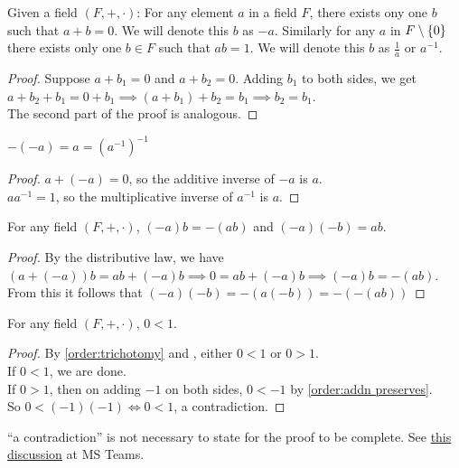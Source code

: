 \documentclass[12pt]{article}
\begin{document}
\begin{lem} \label{lem:unique inverses}
    Given a field $(F, +, \cdot)$: For any element $a$ in a field $F$, there exists ony one $b$ such that $a + b = 0$. We will denote this $b$ as $-a$. Similarly for any $a$ in $F \setminus \set{0}$ there exists only one $b \in F$ such that $ab = 1$. We will denote this $b$ as $\frac{1}{a}$ or $a^{-1}$.
\end{lem}
\begin{proof}
    Suppose $a + b_{1} = 0$ and $a + b_{2} = 0$. Adding $b_{1}$ to both sides, we get $a + b_{2} + b_{1} = 0 + b_{1} \implies (a + b_{1}) + b_{2} = b_{1} \implies b_{2} = b_{1}$. \\
    The second part of the proof is analogous.
\end{proof}

\begin{lem} \label{lem:inverse involution}
    $-(-a) = a = (a^{-1})^{-1}$
\end{lem}
\begin{proof}
    $a + (-a) = 0$, so the additive inverse of $-a$ is $a$. \\
    $aa^{-1} = 1$, so the multiplicative inverse of $a^{-1}$ is $a$.
\end{proof}

\begin{lem} \label{lem:(-a)b=-(ab)}
    For any field $(F, +, \cdot)$, $(-a)b = -(ab)$ and $(-a)(-b) = ab$.
\end{lem}
\begin{proof}
    By the distributive law, we have $(a + (-a))b = ab + (-a)b \implies 0 = ab + (-a)b \implies (-a)b = -(ab)$. From this it follows that $(-a)(-b) = -(a(-b)) = -(-(ab))$
\end{proof}

\begin{thm} \label{thm:0<1}
    For any field $(F, +, \cdot)$, $0 < 1$.
\end{thm}
\begin{proof}
    By \cref{order:trichotomy} and , either $0 < 1$ or $0 > 1$. \\
    If $0 < 1$, we are done. \\
    If $0 > 1$, then on adding $-1$ on both sides, $0 < -1$ by \cref{order:addn preserves}. \\
    So $0 < (-1)(-1) \iff 0 < 1$, a contradiction.
\end{proof}
\begin{rem}
    ``a contradiction'' is not necessary to state for the proof to be complete. See \href{https://teams.microsoft.com/l/message/19:5PNDOetYK3gbPZWX5Muk\_KnaEXgulRmRNwNmAHA8dZ81@thread.tacv2/1666960265828?tenantId=6f15cd97-f6a7-41e3-b2c5-ad4193976476&groupId=9cf683b7-9233-4d97-a7eb-1dc0051039a7&parentMessageId=1666960265828&teamName=UM\%20101\%20October\%202022&channelName=General&createdTime=1666960265828&allowXTenantAccess=false}{this discussion} at MS Teams.
\end{rem}
\end{document}
